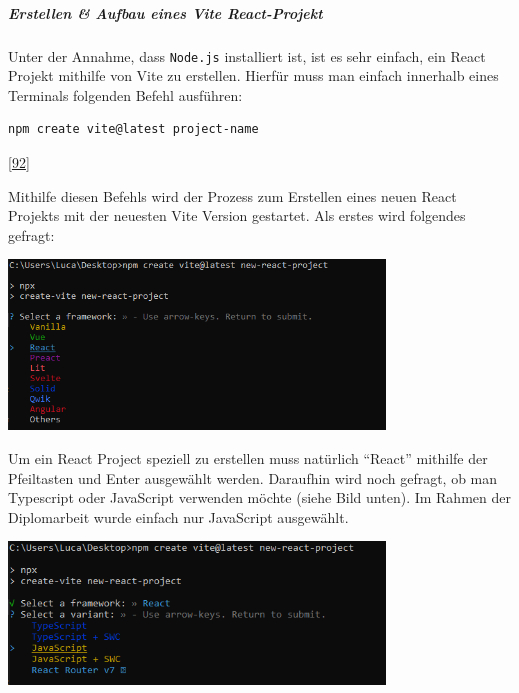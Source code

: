 \documentclass[
    headings=optiontotocandhead,%
    twoside,
    numbers=noenddot,%
    12pt, %
    titlepage, %
    parskip=full, %
    listof=leveldown, 
    numbers=noenddot, %
    a4paper,DIV=14,
    BCOR=15mm,
]{scrbook}
\newcommand{\passthrough}[1]{#1}
\let\origfigure=\figure
\let\endorigfigure=\endfigure
\renewenvironment{figure}[1][]{%
   \origfigure[H]
}{%
   \endorigfigure
}
\begin{document}
\hypertarget{erstellen-aufbau-eines-vite-react-projekt}{%
\subparagraph{Erstellen \& Aufbau eines Vite
React-Projekt}\label{erstellen-aufbau-eines-vite-react-projekt}}

Unter der Annahme, dass \passthrough{\lstinline!Node.js!} installiert
ist, ist es sehr einfach, ein React Projekt mithilfe von Vite zu
erstellen. Hierfür muss man einfach innerhalb eines Terminals folgenden
Befehl ausführen:

\begin{lstlisting}[caption={Befehl zum Erstellen eines React-Projekts mit Vite}]
npm create vite@latest project-name
\end{lstlisting}

{[}\protect\hyperlink{ref-React-CrashCourse}{92}{]}

Mithilfe diesen Befehls wird der Prozess zum Erstellen eines neuen React
Projekts mit der neuesten Vite Version gestartet. Als erstes wird
folgendes gefragt:

\begin{figure}
\centering
\includegraphics[width=0.75\textwidth,height=\textheight]{img/Gekle/CreateProject1.png}
\caption{Auswahl des Projekttyps nach npm Befehl}
\end{figure}

Um ein React Project speziell zu erstellen muss natürlich ``React''
mithilfe der Pfeiltasten und Enter ausgewählt werden. Daraufhin wird
noch gefragt, ob man Typescript oder JavaScript verwenden möchte (siehe
Bild unten). Im Rahmen der Diplomarbeit wurde einfach nur JavaScript
ausgewählt.

\begin{figure}
\centering
\includegraphics[width=0.75\textwidth,height=\textheight]{img/Gekle/CreateProject2.png}
\caption{Auswahl zwischen TypeScript und Javascript während der
Projekterstellung}
\end{figure}
\end{document}
